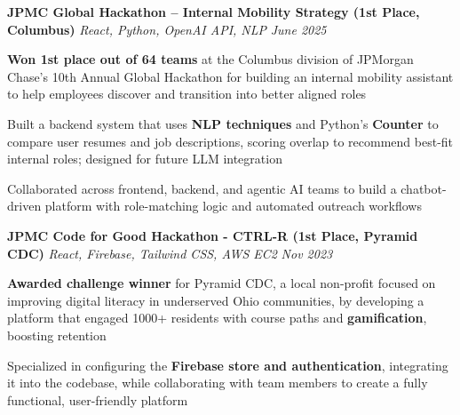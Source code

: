 \documentclass[letterpaper]{article}
\begin{document}

    {\textbf{JPMC Global Hackathon – Internal Mobility Strategy (1st Place, Columbus)}} {\sl React, Python, OpenAI API, NLP} \hfill \textsl{June 2025} \\
    \vspace{-2mm}
    \begin{tightitemize} \itemsep -1mm
        \item \textbf{Won 1st place out of 64 teams} at the Columbus division of JPMorgan Chase’s 10th Annual Global Hackathon for building an internal mobility assistant to help employees discover and transition into better aligned roles
        \item Built a backend system that uses \textbf{NLP techniques} and Python's \textbf{Counter} to compare user resumes and job descriptions, scoring overlap to recommend best-fit internal roles; designed for future LLM integration
        \item Collaborated across frontend, backend, and agentic AI teams to build a chatbot-driven platform with role-matching logic and automated outreach workflows
    \end{tightitemize}

    \vspace{-2mm}
    {\textbf{JPMC Code for Good Hackathon - CTRL-R (1st Place, Pyramid CDC)}} {\sl React, Firebase, Tailwind CSS, AWS EC2} \hfill \textsl{Nov 2023}\\
    \vspace{-2mm}
    \begin{tightitemize} \itemsep -1mm
    
        \item \textbf{Awarded challenge winner} for Pyramid CDC, a local non-profit focused on improving digital literacy in underserved Ohio communities, by developing a platform that engaged 1000+ residents with course paths and \textbf{gamification}, boosting retention

        \item Specialized in configuring the \textbf{Firebase store and authentication}, integrating it into the codebase, while collaborating with team members to create a fully functional, user-friendly platform

    \end{tightitemize}
    \vspace{-2mm}
\end{document}
